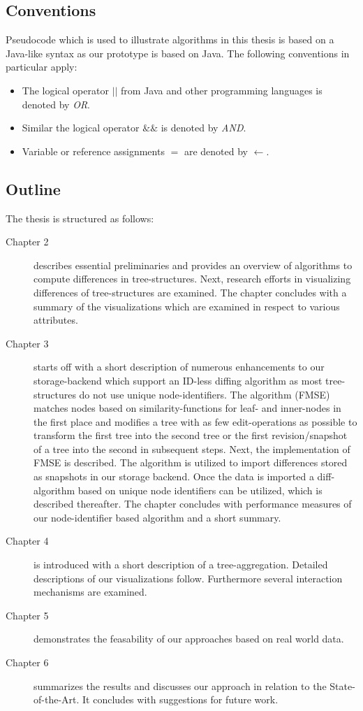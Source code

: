 \subsection{Conventions}
Pseudocode which is used to illustrate algorithms in this thesis is based on a Java-like syntax as our prototype is based on Java. The following conventions in particular apply:

\begin{itemize}
\item The logical operator \emph{$||$} from Java and other programming languages is denoted by \emph{OR}.
\item Similar the logical operator \emph{$\&\&$} is denoted by \emph{AND}.
\item Variable or reference assignments \emph{$=$} are denoted by \emph{$\leftarrow$}.
\end{itemize}

\subsection{Outline}
The thesis is structured as follows:

\begin{description}
\item[Chapter 2] describes essential preliminaries and provides an overview of algorithms to compute differences in tree-structures. Next, research efforts in visualizing differences of tree-structures are examined. The chapter concludes with a summary of the visualizations which are examined in respect to various attributes.
\item[Chapter 3] starts off with a short description of numerous enhancements to our storage-backend which support an ID-less diffing algorithm as most tree-structures do not use unique node-identifiers. The algorithm (FMSE) matches nodes based on similarity-functions for leaf- and inner-nodes in the first place and modifies a tree with as few edit-operations as possible to transform the first tree into the second tree or the first revision/snapshot of a tree into the second in subsequent steps. Next, the implementation of FMSE is described. The algorithm is utilized to import differences stored as snapshots in our storage backend. Once the data is imported a diff-algorithm based on unique node identifiers can be utilized, which is described thereafter. The chapter concludes with performance measures of our node-identifier based algorithm and a short summary.
\item[Chapter 4] is introduced with a short description of a tree-aggregation. Detailed descriptions of our visualizations follow. Furthermore several interaction mechanisms are examined.
\item[Chapter 5] demonstrates the feasability of our approaches based on real world data.
\item[Chapter 6] summarizes the results and discusses our approach in relation to the State-of-the-Art. It concludes with suggestions for future work.
\end{description}


